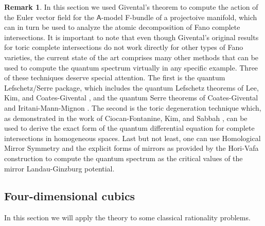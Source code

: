 \documentclass[twoside,leqno]{article}
\numberwithin{equation}{section}
\theoremstyle{plain}
\theoremstyle{definition}
\newtheorem{remark}[equation]{Remark}
\begin{document}
\begin{remark}
\label{rem-other.techniques} In this section we used Givental's theorem to compute the action of the Euler vector field for the $\mathsf{A}$-model F-bundle of a projectoive manifold, which can in turn be used to analyze the atomic decomposition of Fano complete intersections. It is important to note that even though Givental's original results  for toric complete intersections do not work directly for other types of Fano varieties, the current state of the art comprises many other methods that can be used to compute the quantum spectrum virtually in any specific example. Three of these techniques deserve special attention. The first is  the quantum Lefschetz/Serre package, which includes the quantum Lefschetz theorems of Lee, Kim, and Coates-Givental \cite{Lee_YP-qLefschetz,Kim-qLefschetz,CoatesGivental}, and the quantum Serre theorems of Coates-Givental and  Iritani-Mann-Mignon \cite{CoatesGivental,IritaniMannMignon}. The second is the toric degeneration  technique which, as demonstrated in the work of Ciocan-Fontanine, Kim, and  Sabbah \cite{CFKS}, can be used to derive the exact form of the quantum differential equation for complete intersections in homogeneous spaces. Last but not least, one can use Homological Mirror Symmetry and the explicit forms of 
mirrors as provided by the Hori-Vafa construction \cite{Hori_Vafa_Mirror_symmetry} to compute the quantum spectrum as the critical values of the mirror Landau-Ginzburg potential.
\end{remark}



\subsection{Four-dimensional cubics} \label{ssec:Cubics}

In this section we will apply the theory to some classical rationality problems.
\end{document}
